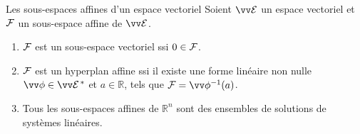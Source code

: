 \documentclass[bigger]{m53beamer}
\begin{document}
  \begin{frame}{Les sous-espaces affines d'un espace vectoriel}
    Soient $\ev{E}$ un espace vectoriel et $\mathcal{F}$ un sous-espace affine de $\ev{E}$.
    \begin{enumerate}[<+(1)->]
      \item $\mathcal{F}$ est un sous-espace vectoriel ssi $0 \in \mathcal{F}$.
      \item $\mathcal{F}$ est un hyperplan affine ssi il existe une forme linéaire non nulle $\vv\phi\in\ev{E}^{\,*}$ et $a \in \mathbb{R}$, tels que $\ens{F}=\vv\phi^{-1}(a)$.
      \item Tous les sous-espaces affines de $\mathbb{R}^{n}$ sont des ensembles de solutions de systèmes linéaires.
    \end{enumerate}
  \end{frame}
\end{document}
